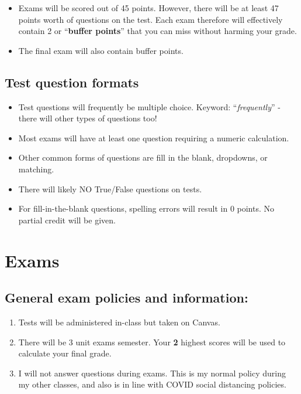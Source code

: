 \documentclass[
]{book}
\providecommand{\tightlist}{%
  \setlength{\itemsep}{0pt}\setlength{\parskip}{0pt}}
\begin{document}
\begin{itemize}
\tightlist
\item
  Exams will be scored out of 45 points. However, there will be at least 47 points worth of questions on the test. Each exam therefore will effectively contain 2 or ``\textbf{buffer points}'' that you can miss without harming your grade.
\item
  The final exam will also contain buffer points.
\end{itemize}

\hypertarget{test-question-formats}{%
\section{Test question formats}\label{test-question-formats}}

\begin{itemize}
\tightlist
\item
  Test questions will frequently be multiple choice. Keyword: ``\emph{frequently}'' - there will other types of questions too!
\item
  Most exams will have at least one question requiring a numeric calculation.\\
\item
  Other common forms of questions are fill in the blank, dropdowns, or matching.
\item
  There will likely NO True/False questions on tests.
\item
  For fill-in-the-blank questions, spelling errors will result in 0 points. No partial credit will be given.
\end{itemize}

\hypertarget{exams}{%
\chapter{Exams}\label{exams}}

\hypertarget{general-exam-policies-and-information}{%
\section{General exam policies and information:}\label{general-exam-policies-and-information}}

\begin{enumerate}
\def\labelenumi{\arabic{enumi}.}
\tightlist
\item
  Tests will be administered in-class but taken on Canvas.
\item
  There will be 3 unit exams semester. Your \textbf{2} highest scores will be used to calculate your final grade.
\item
  I will not answer questions during exams. This is my normal policy during my other classes, and also is in line with COVID social distancing policies.
\end{enumerate}
\end{document}
